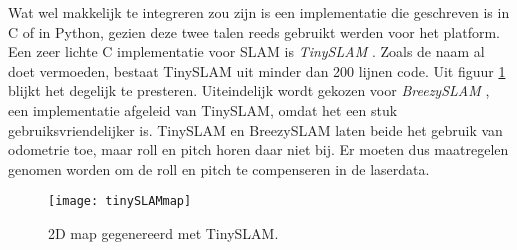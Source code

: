 \npar Wat wel makkelijk te integreren zou zijn is een implementatie die geschreven is in C of in Python, gezien deze twee talen reeds gebruikt werden voor het platform. Een zeer lichte C implementatie voor SLAM is \textit{TinySLAM} \cite{paper:tinySLAM} \cite{paper:tinySLAM2}. Zoals de naam al doet vermoeden, bestaat TinySLAM uit minder dan 200 lijnen code. Uit figuur \ref{fig:tinyslammap} blijkt het degelijk te presteren. Uiteindelijk wordt gekozen voor \textit{BreezySLAM} \cite{thesis:BreezySLAM} \cite{url:BreezySLAMlib}, een implementatie afgeleid van TinySLAM, omdat het een stuk gebruiksvriendelijker is. TinySLAM en BreezySLAM laten beide het gebruik van odometrie toe, maar roll en pitch horen daar niet bij. Er moeten dus maatregelen genomen worden om de roll en pitch te compenseren in de laserdata.

\begin{figure}[h]
	\centering
	\texttt{[image: tinySLAMmap]}
	\caption{2D map gegenereerd met TinySLAM.} \label{fig:tinyslammap}
\end{figure}
